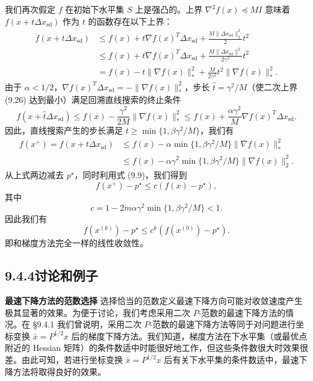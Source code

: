 \documentclass[UTF8, 12pt, fontset=fandol, oneside]{ctexart}
\begin{document}
我们再次假定 $f$ 在初始下水平集 $S$ 上是强凸的。上界 $\nabla^2 f(x)\preceq MI$ 意味着 $f(x+t\Delta x_{\mathrm{sd}})$ 作为 $t$ 的函数存在以下上界：
\begin{equation}
\begin{aligned}
f(x+t\Delta x_{\mathrm{sd}})
&\leq f(x)+t\nabla f(x)^T\Delta x_{\mathrm{sd}}+\frac{M\|\Delta x_{\mathrm{sd}}\|_2^2}{2}t^2\\
&\leq f(x)+t\nabla f(x)^T\Delta x_{\mathrm{sd}}+\frac{M\|\Delta x_{\mathrm{sd}}\|^2}{2\gamma^2}t^2\\
&=f(x)-t\|\nabla f(x)\|_\ast^2+\frac{M}{2\gamma^2}t^2\|\nabla f(x)\|_\ast^2.
\end{aligned}
\tag{9.26}
\end{equation}
由于 $\alpha<1/2$，$\nabla f(x)^T\Delta x_{\mathrm{sd}}=-\|\nabla f(x)\|_\ast^2$，步长 $\hat{t}=\gamma^2/M$（使二次上界 (9.26) 达到最小）满足回溯直线搜索的终止条件
\begin{equation}
f(x+\hat{t}\Delta x_{\mathrm{sd}})\leq f(x)-\frac{\gamma^2}{2M}\|\nabla f(x)\|_\ast^2
\leq f(x)+\frac{\alpha\gamma^2}{M}\nabla f(x)^T\Delta x_{\mathrm{sd}}.
\tag{9.27}
\end{equation}
因此，直线搜索产生的步长满足 $t\geq\min\{1,\beta\gamma^2/M\}$，我们有
\[
\begin{aligned}
f(x^+)=f(x+t\Delta x_{\mathrm{sd}})
&\leq f(x)-\alpha\min\{1,\beta\gamma^2/M\}\|\nabla f(x)\|_\ast^2\\
&\leq f(x)-\alpha\gamma^2\min\{1,\beta\gamma^2/M\}\|\nabla f(x)\|_2^2.
\end{aligned}
\]
从上式两边减去 $p^\star$，同时利用式 (9.9)，我们得到
\[
f(x^+)-p^\star\leq c(f(x)-p^\star),
\]
其中
\[
c=1-2m\alpha\gamma^2\min\{1,\beta\gamma^2/M\}<1.
\]
因此我们有
\[
f(x^{(k)})-p^\star\leq c^k(f(x^{(0)})-p^\star).
\]
即和梯度方法完全一样的线性收敛性。

\subsection*{9.4.4\quad 讨论和例子}

\noindent\textbf{最速下降方法的范数选择}\quad
选择恰当的范数定义最速下降方向可能对收敛速度产生极其显著的效果。为便于讨论，我们考虑采用二次 $P$-范数的最速下降方法的情况。在 \S9.4.1 我们曾说明，采用二次 $P$-范数的最速下降方法等同于对问题进行坐标变换 $\bar{x}=P^{1/2}x$ 后的梯度下降方法。我们知道，梯度方法在下水平集（或最优点附近的 Hessian 矩阵）的条件数适中时能很好地工作，但这些条件数很大时效果很差。由此可知，若进行坐标变换 $\bar{x}=P^{1/2}x$ 后有关下水平集的条件数适中，最速下降方法将取得良好的效果。
\end{document}
